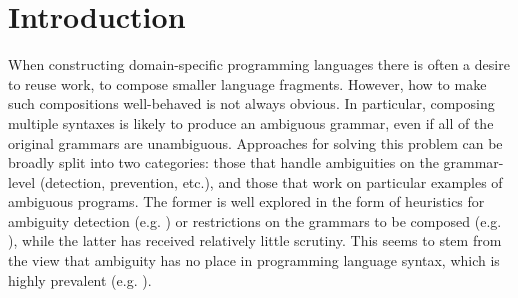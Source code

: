 \documentclass[acmsmall,review,anonymous]{acmart}\settopmatter{printfolios=true,printccs=false,printacmref=false}
\begin{document}




\maketitle


\section{Introduction}

When constructing domain-specific programming languages there is often a desire to reuse work, to compose smaller language fragments. However, how to make such compositions well-behaved is not always obvious. In particular, composing multiple syntaxes is likely to produce an ambiguous grammar, even if all of the original grammars are unambiguous. Approaches for solving this problem can be broadly split into two categories: those that handle ambiguities on the grammar-level (detection, prevention, etc.), and those that work on particular examples of ambiguous programs. The former is well explored in the form of heuristics for ambiguity detection (e.g. \cite{bastenAmbiguityDetectionProgramming2011,axelssonAnalyzingContextFreeGrammars2008,brabrandAnalyzingAmbiguityContextFree2007}) or restrictions on the grammars to be composed (e.g. \cite{kaminskiModularWellDefinednessAnalysis2013}), while the latter has received relatively little scrutiny. This seems to stem from the view that ambiguity has no place in programming language syntax, which is highly prevalent (e.g. \cite{sudkampLanguagesMachinesIntroduction1997,ahoCompilersPrinciplesTechniques2006,webberModernProgrammingLanguages2003,cooperEngineeringCompiler2011,ginsburgAmbiguityContextFree1966}).
\end{document}
